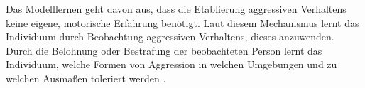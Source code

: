Das Modelllernen geht davon aus, dass die Etablierung aggressiven Verhaltens keine eigene, motorische Erfahrung benötigt. Laut diesem Mechanismus lernt das Individuum durch Beobachtung aggressiven Verhaltens, dieses anzuwenden. Durch die Belohnung oder Bestrafung der beobachteten Person lernt das Individuum, welche Formen von Aggression in welchen Umgebungen und zu welchen Ausmaßen toleriert werden \parencite{Aggro_Theorie_Buch}.